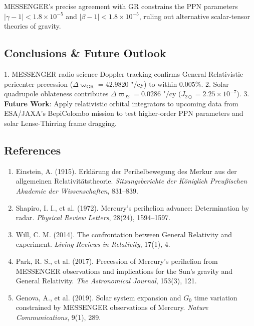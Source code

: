 \documentclass[11pt,a4paper]{article}
\begin{document}
MESSENGER's precise agreement with GR constrains the PPN parameters $|\gamma - 1| < 1.8 \times 10^{-5}$ and $|\beta - 1| < 1.8 \times 10^{-5}$, ruling out alternative scalar-tensor theories of gravity.

\subsection{Conclusions \& Future Outlook}
1. MESSENGER radio science Doppler tracking confirms General Relativistic pericenter precession ($\Delta \varpi_{\text{GR}} = 42.9820\text{ "/cy}$) to within $0.005\%$.
2. Solar quadrupole oblateness contributes $\Delta \varpi_{J2} = 0.0286\text{ "/cy}$ ($J_{2\odot} = 2.25 \times 10^{-7}$).
3. \textbf{Future Work}: Apply relativistic orbital integrators to upcoming data from ESA/JAXA's BepiColombo mission to test higher-order PPN parameters and solar Lense-Thirring frame dragging.

\subsection*{References}
\begin{enumerate}
    \item Einstein, A. (1915). Erklärung der Perihelbewegung des Merkur aus der allgemeinen Relativitätstheorie. \textit{Sitzungsberichte der Königlich Preußischen Akademie der Wissenschaften}, 831--839.
    \item Shapiro, I. I., et al. (1972). Mercury's perihelion advance: Determination by radar. \textit{Physical Review Letters}, 28(24), 1594--1597.
    \item Will, C. M. (2014). The confrontation between General Relativity and experiment. \textit{Living Reviews in Relativity}, 17(1), 4.
    \item Park, R. S., et al. (2017). Precession of Mercury's perihelion from MESSENGER observations and implications for the Sun's gravity and General Relativity. \textit{The Astronomical Journal}, 153(3), 121.
    \item Genova, A., et al. (2019). Solar system expansion and $G_0$ time variation constrained by MESSENGER observations of Mercury. \textit{Nature Communications}, 9(1), 289.
\end{enumerate}

\newpage

\end{document}
